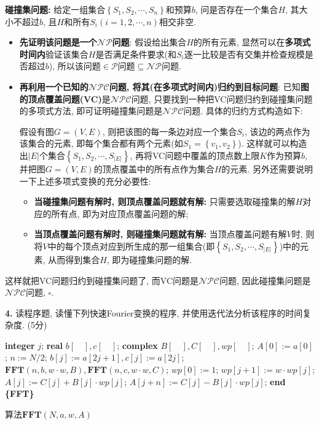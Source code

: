 \documentclass{article}
\begin{document}
\solution \textbf{碰撞集问题:} 给定一组集合$\left\{ S_1,S_2,\cdots ,S_n \right\}$和预算$b$, 问是否存在一个集合$H$, 其大小不超过$b$, 且$H$和所有$S_i(i=1,2,\cdots,n)$相交非空.
\begin{itemize}
    \item \textbf{先证明该问题是一个$\mathcal{NP}$问题}: 假设给出集合$H$的所有元素, 显然可以在\textbf{多项式时间内}验证该集合$H$是否满足条件要求(和$S_i$逐一比较是否有交集并检查规模是否超过$b$), 所以该问题$\in \mathcal{P}$问题$\subseteq \mathcal{NP}$问题.
    \item \textbf{再利用一个已知的$\mathcal{NPC}$问题, 将其(在多项式时间内)归约到目标问题}: 已知\textbf{图的顶点覆盖问题(VC)}是$\mathcal{NPC}$问题, 只要找到一种把VC问题归约到碰撞集问题的多项式方法, 即可证明碰撞集问题是$\mathcal{NPC}$问题. 具体的归约方式构造如下:
    
    假设有图$G=(V,E)$, 则把该图的每一条边对应一个集合$S_i$, 该边的两点作为该集合的元素, 即每个集合都有两个元素(如$S_1=\left\{ v_1,v_2 \right\}$). 这样就可以构造出$|E|$个集合$\left\{ S_1,S_2,\cdots ,S_{\left| E \right|} \right\}$, 再将VC问题中覆盖的顶点数上限$K$作为预算$b$, 并把图$G=(V,E)$的顶点覆盖中的所有点作为集合$H$的元素. 另外还需要说明一下上述多项式变换的充分必要性:
    \begin{itemize}
        \item \textbf{当碰撞集问题有解时, 则顶点覆盖问题就有解:} 只需要选取碰撞集的解$H$对应的所有点, 即为对应顶点覆盖问题的解;
        \item \textbf{当顶点覆盖问题有解时, 则碰撞集问题就有解:} 当顶点覆盖问题有解$V$时, 则将$V$中的每个顶点对应到所生成的那一组集合(即$\left\{ S_1,S_2,\cdots ,S_{\left| E \right|} \right\}$)中的元素, 从而得到集合$H$, 即为碰撞集问题的解.
    \end{itemize}
\end{itemize}
这样就把VC问题归约到碰撞集问题了, 而VC问题是$\mathcal{NPC}$问题, 因此碰撞集问题是$\mathcal{NPC}$问题, $\square$.

\newpage

\textbf{4.} 读程序题, 读懂下列快速Fourier变换的程序, 并使用迭代法分析该程序的时间复杂度. (5分)

\begin{algorithm}[H]
    \begin{algorithmic}[1]
    \State \textbf{integer} $j$;
    \State \textbf{real} $b[\quad],c[\quad]$;
    \State \textbf{complex} $B[\quad],C[\quad],wp[\quad]$;
        \State $A[0]:=a[0]$;
    \Else
        \State $n:=N/2$;
            \State $b[j]:=a[2j+1],c[j]:=a[2j]$;
        \EndFor
    \EndIf
    \State $\textbf{FFT}\left(n,b,w\cdot w,B\right),\textbf{FFT}\left(n,c,w\cdot w,C\right)$;
    \State $wp[0]:=1$;
        \State $wp[j+1]:=w\cdot wp[j]$;
        \State $A[j]:=C[j]+B[j]\cdot wp[j]$;
        \State $A[j+n]:=C[j]-B[j]\cdot wp[j]$;
    \EndFor
    \State \textbf{end \{FFT\}}
    \end{algorithmic}
    \caption{算法$\textbf{FFT}(N,a,w,A)$}
    \label{alg:FFT}
\end{algorithm}
\end{document}
